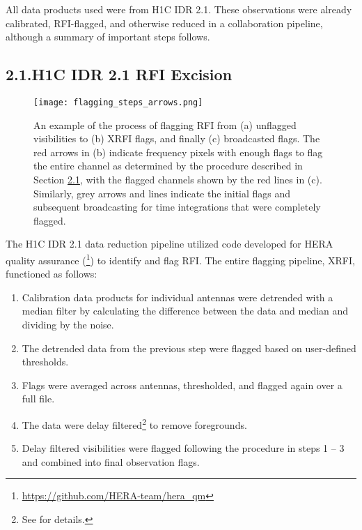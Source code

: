 \documentclass[12pt]{article}
\begin{document}
All data products used were from H1C IDR 2.1. These observations were already calibrated, RFI-flagged, and otherwise reduced in a collaboration pipeline, although a summary of important steps follows. \vspace{3mm}

\tocless\subsection{\hypertarget{subsec:h1crfi}{2.1.\hspace{0.75em}H1C IDR 2.1 RFI Excision}}

\begin{figure}[p]
	\centering
	\texttt{[image: flagging\_steps\_arrows.png]}
	\caption[Steps for flagging RFI]{An example of the process of flagging RFI from (a) unflagged visibilities to (b) XRFI flags, and finally (c) broadcasted flags. The red arrows in (b) indicate frequency pixels with enough flags to flag the entire channel as determined by the procedure described in Section \hyperlink{subsec:h1crfi}{2.1}, with the flagged channels shown by the red lines in (c). Similarly, grey arrows and lines indicate the initial flags and subsequent broadcasting for time integrations that were completely flagged.}
	\label{fig:rfi_flagging}
\end{figure}

The H1C IDR 2.1 data reduction pipeline utilized code developed for HERA quality assurance (\heraqm\footnote{\url{https://github.com/HERA-team/hera_qm}}) to identify and flag RFI. The entire flagging pipeline, XRFI, functioned as follows:

\begin{enumerate}
	\item Calibration data products for individual antennas were detrended with a median filter by calculating the difference between the data and median and dividing by the noise.
	\item The detrended data from the previous step were flagged based on user-defined thresholds.
	\item Flags were averaged across antennas, thresholded, and flagged again over a full file.
	\item The data were delay filtered\footnote{See \cite{parsons2012} for details.} to remove foregrounds.
	\item Delay filtered visibilities were flagged following the procedure in steps 1 -- 3 and combined into final observation flags.
\end{enumerate}
\end{document}
